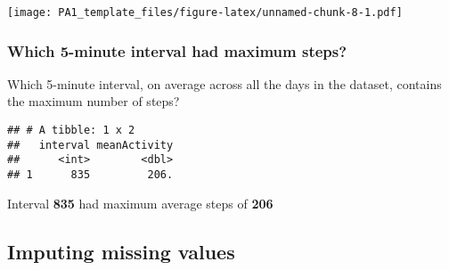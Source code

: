 \documentclass[]{article}
\newenvironment{Shaded}{\begin{snugshade}}{\end{snugshade}}
\newcommand{\CommentTok}[1]{\textcolor[rgb]{0.56,0.35,0.01}{\textit{#1}}}
\newcommand{\DataTypeTok}[1]{\textcolor[rgb]{0.13,0.29,0.53}{#1}}
\newcommand{\KeywordTok}[1]{\textcolor[rgb]{0.13,0.29,0.53}{\textbf{#1}}}
\newcommand{\NormalTok}[1]{#1}
\newcommand{\OperatorTok}[1]{\textcolor[rgb]{0.81,0.36,0.00}{\textbf{#1}}}
\newcommand{\OtherTok}[1]{\textcolor[rgb]{0.56,0.35,0.01}{#1}}
\newcommand{\StringTok}[1]{\textcolor[rgb]{0.31,0.60,0.02}{#1}}
\begin{document}
\begin{Shaded}
\end{Shaded}

\texttt{[image: PA1\_template\_files/figure-latex/unnamed-chunk-8-1.pdf]}

\hypertarget{which-5-minute-interval-had-maximum-steps}{%
\subsubsection{Which 5-minute interval had maximum
steps?}\label{which-5-minute-interval-had-maximum-steps}}

Which 5-minute interval, on average across all the days in the dataset,
contains the maximum number of steps?

\begin{Shaded}
\end{Shaded}

\begin{verbatim}
## # A tibble: 1 x 2
##   interval meanActivity
##      <int>        <dbl>
## 1      835         206.
\end{verbatim}

Interval \textbf{835} had maximum average steps of \textbf{206}

\hypertarget{imputing-missing-values}{%
\subsection{Imputing missing values}\label{imputing-missing-values}}
\end{document}
